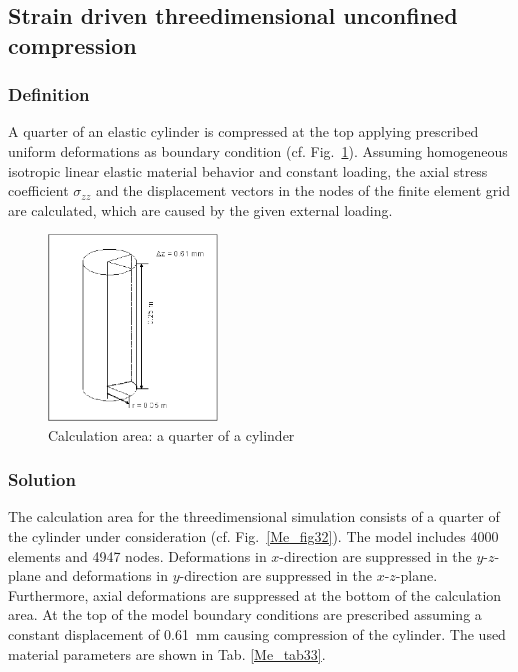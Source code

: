 \subsection{Strain driven threedimensional unconfined compression}
\label{subsec:Me4}

\subsubsection{Definition}
\label{subsubsec:Me4_def}

A quarter of an elastic cylinder is compressed at the top applying prescribed uniform deformations as boundary condition (cf. Fig.~\ref{Me_fig31}). Assuming homogeneous isotropic linear elastic material behavior and constant loading, the axial stress coefficient $\sigma_{zz}$ and the displacement vectors in the nodes of the finite element grid are calculated, which are caused by the given external loading.

\begin{figure}[htbp]
\centering
\includegraphics[width=0.4\textwidth]{PART_II/M/fig31.eps}
\caption{Calculation area: a quarter of a cylinder}
\label{Me_fig31}
\end{figure}

\subsubsection{Solution}
\label{subsubsec:Me4_sol}

The calculation area for the threedimensional simulation consists of a quarter of the cylinder under consideration (cf. Fig.~\ref{Me_fig32}). The model includes 4000 elements and 4947 nodes. Deformations in $x$-direction are suppressed in the $y$-$z$-plane and deformations in $y$-direction are suppressed in the $x$-$z$-plane. Furthermore, axial deformations are suppressed at the bottom of the calculation area. At the top of the model boundary conditions are prescribed assuming a constant displacement of 0.61~mm causing compression of the cylinder. The used material parameters are shown in Tab. \ref{Me_tab33}.

